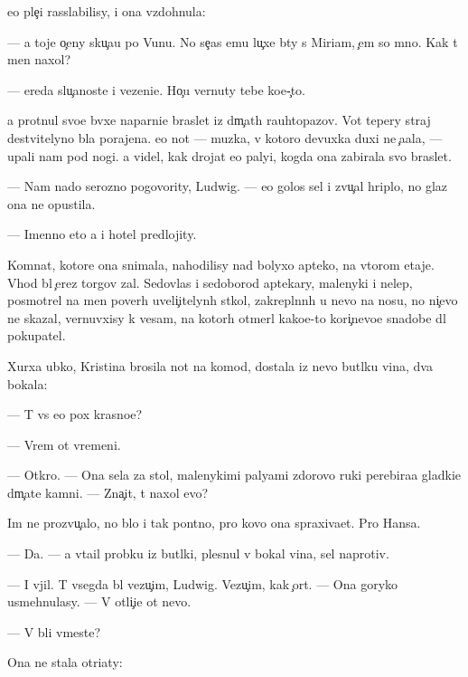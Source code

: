 \documentclass[10pt]{book}
\begin{document}
{\Y}e{\y}o ple{\c}i rasslabilisy, i ona vzdohnula:

— {\Y}a toje o{\c}eny sku{\c}a{\y}u po V{\y}unu. No se{\y}{\c}as {\y}emu lu{\c}xe b{\yi}ty s Miriam, {\c}em so mno{\y}. Kak t{\yi} men{\ia} naxol?

— {\C}ereda slu{\c}a{\y}noste{\y} i vezeni{\y}e. Ho{\c}u vernuty tebe ko{\y}e-{\c}to.

{\Y}a prot{\ia}nul svo{\y}e{\y} b{\yi}vxe{\y} naparni{\q}e braslet iz d{\yi}m{\c}at{\yi}h rauhtopazov. Vot tepery straj de{\y}stvitelyno b{\yi}la porajena. {\Y}e{\y}o not{\yi} — muz{\yi}ka, v kotoro{\y} devuxka duxi ne {\c}a{\y}ala, — upali nam pod nogi. {\Y}a videl, kak drojat {\y}e{\y}o paly{\q}i, kogda ona zabirala svo{\y} braslet.

— Nam nado ser{\y}ozno pogovority, Ludwig. — {\Y}e{\y}o golos sel i zvu{\c}al hriplo, no glaz ona ne opustila.

— Imenno eto {\y}a i hotel predlojity.



Komnat{\yi}, kotor{\yi}{\y}e ona snimala, nahodilisy nad bolyxo{\y} apteko{\y}, na vtorom etaje. Vhod b{\yi}l {\c}erez torgov{\yi}{\y} zal. Sedovlas{\yi}{\y} i sedoborod{\yi}{\y} aptekary, malenyki{\y} i nelep{\yi}{\y}, posmotrel na men{\ia} poverh uveli{\c}itelyn{\yi}h st{\e}kol, zakrepl{\e}nn{\yi}h u nevo na nosu, no ni{\c}evo ne skazal, vernuvxisy k vesam, na kotor{\yi}h otmer{\ia}l kako{\y}e-to kori{\c}nevo{\y}e snadob{\y}e dl{\ia} pokupatel{\ia}.

Xurxa {\y}ubko{\y}, Kristina brosila not{\yi} na komod, dostala iz nevo but{\yi}lku vina, dva bokala:

— T{\yi} vs{\e} {\y}e{\x}o p{\y}ox krasno{\y}e?

— Vrem{\ia} ot vremeni.

— Otkro{\y}. — Ona sela za stol, malenykimi paly{\q}ami zdorovo{\y} ruki perebira{\y}a gladki{\y}e d{\yi}m{\c}at{\yi}{\y}e kamni. — Zna{\c}it, t{\yi} naxol {\y}evo?

Im{\ia} ne prozvu{\c}alo, no b{\yi}lo i tak pon{\ia}tno, pro kovo ona spraxiva{\y}et. Pro Hansa.

— Da. — {\Y}a v{\yi}ta{\x}il probku iz but{\yi}lki, plesnul v bokal{\yi} vina, sel naprotiv.

— I v{\yi}jil. T{\yi} vsegda b{\yi}l vezu{\c}im, Ludwig. Vezu{\c}im, kak {\c}ort. — Ona goryko usmehnulasy. — V otli{\c}i{\y}e ot nevo.

— V{\yi} b{\yi}li vmeste?

Ona ne stala otri{\q}aty:
\end{document}
